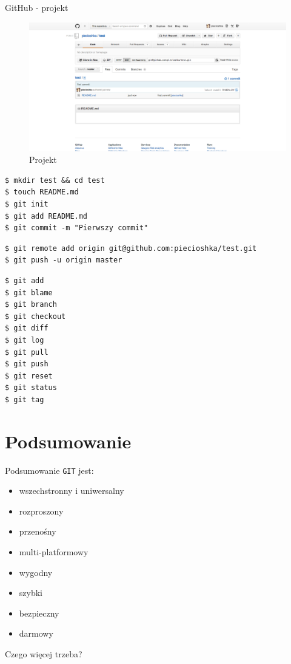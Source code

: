 \documentclass{beamer}
\begin{document}
\begin{frame}{GitHub - projekt}
  \begin{figure}
  \includegraphics[width=\textwidth]{photos/project.png}
  \caption{\label{fig:project}Projekt}
  \end{figure}
\end{frame}

\begin{framed}
\begin{lstlisting}[frame=none, caption=Praca lokalna]
$ mkdir test && cd test
$ touch README.md
$ git init
$ git add README.md
$ git commit -m "Pierwszy commit"
\end{lstlisting}
\end{framed}

\begin{framed}
\begin{lstlisting}[frame=none, caption=Praca zdalna]
$ git remote add origin git@github.com:piecioshka/test.git
$ git push -u origin master
\end{lstlisting}
\end{framed}

\begin{framed}
\begin{lstlisting}[frame=none, caption=Najpopularniejsze polecenia]
$ git add
$ git blame
$ git branch
$ git checkout
$ git diff
$ git log
$ git pull
$ git push
$ git reset
$ git status
$ git tag
\end{lstlisting}
\end{framed}


\section{Podsumowanie}

\begin{frame}{Podsumowanie}
\texttt{GIT} jest:
\begin{itemize}
  \item wszechstronny i uniwersalny
  \item rozproszony
  \item przenośny
  \item multi-platformowy
  \item wygodny
  \item szybki
  \item bezpieczny
  \item darmowy
\end{itemize}
\vskip 1cm
Czego więcej trzeba?
\end{frame}
\end{document}
